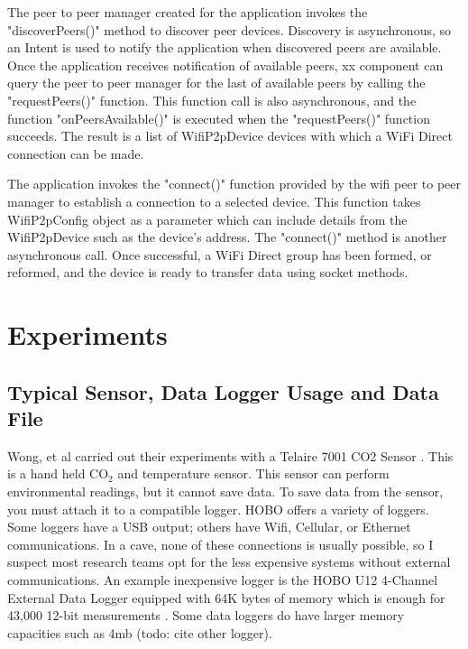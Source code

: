 \documentclass[10pt,twocolumn]{article}
\begin{document}
The peer to peer manager created for the application invokes the "discoverPeers()" method to discover peer devices.
Discovery is asynchronous, so an Intent is used to notify the application when discovered peers are available.
Once the application receives notification of available peers, xx component can query the peer to peer manager for the last of available peers by calling the "requestPeers()" function.
This function call is also asynchronous, and the function "onPeersAvailable()" is executed when the "requestPeers()" function succeeds. 
The result is a list of WifiP2pDevice devices with which a WiFi Direct connection can be made. \cite{androidp2p}

The application invokes the "connect()" function provided by the wifi peer to peer manager to establish a connection to a selected device.
This function takes WifiP2pConfig object as a parameter which can include details from the WifiP2pDevice such as the device's address.
The "connect()" method is another asynchronous call. 
Once successful, a WiFi Direct group has been formed, or reformed, and the device is ready to transfer data using socket methods.

\section{Experiments}

\subsection{Typical Sensor, Data Logger Usage and Data File}
\label{sec:TypicalUsage}
Wong, et al carried out their experiments with a Telaire 7001 CO2 Sensor \cite{telaire} \cite{wong2010}. 
This is a hand held CO$_2$ and temperature sensor.
This sensor can perform environmental readings, but it cannot save data.
To save data from the sensor, you must attach it to a compatible logger.
HOBO offers a variety of loggers.
Some loggers have a USB output; others have Wifi, Cellular, or Ethernet communications.
In a cave, none of these connections is usually possible, so I suspect most research teams opt for the less expensive systems without external communications.
An example inexpensive logger is the HOBO U12 4-Channel External Data Logger equipped with 64K bytes of memory which is enough for 43,000 12-bit measurements \cite{logger}. 
Some data loggers do have larger memory capacities such as 4mb (todo: cite other logger).
\end{document}
